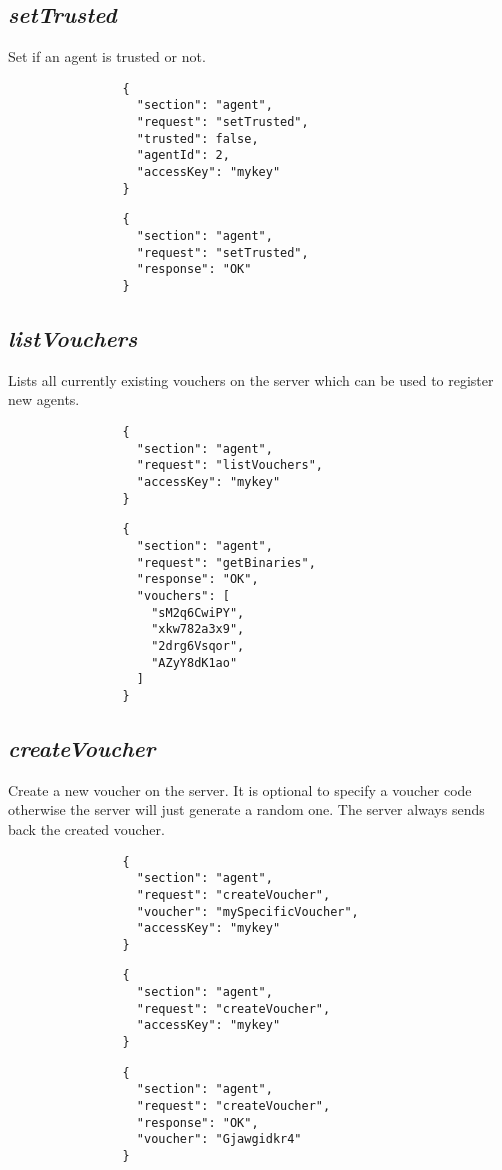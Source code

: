 		\subsection*{\textit{setTrusted}}
			Set if an agent is trusted or not.
			{
				\color{blue}
				\begin{verbatim}
				{
				  "section": "agent",
				  "request": "setTrusted",
				  "trusted": false,
				  "agentId": 2,
				  "accessKey": "mykey"
				}
				\end{verbatim}
			}
			{
				\color{OliveGreen}
				\begin{verbatim}
				{
				  "section": "agent",
				  "request": "setTrusted",
				  "response": "OK"
				}
				\end{verbatim}
			}
		
		\subsection*{\textit{listVouchers}}
			Lists all currently existing vouchers on the server which can be used to register new agents.
			{
				\color{blue}
				\begin{verbatim}
				{
				  "section": "agent",
				  "request": "listVouchers",
				  "accessKey": "mykey"
				}
				\end{verbatim}
			}
			{
				\color{OliveGreen}
				\begin{verbatim}
				{
				  "section": "agent",
				  "request": "getBinaries",
				  "response": "OK",
				  "vouchers": [
				    "sM2q6CwiPY",
				    "xkw782a3x9",
				    "2drg6Vsqor",
				    "AZyY8dK1ao"
				  ]
				}
				\end{verbatim}
			}
		\subsection*{\textit{createVoucher}}
			Create a new voucher on the server. It is optional to specify a voucher code otherwise the server will just generate a random one. The server always sends back the created voucher.
			{
				\color{blue}
				\begin{verbatim}
				{
				  "section": "agent",
				  "request": "createVoucher",
				  "voucher": "mySpecificVoucher",
				  "accessKey": "mykey"
				}
				\end{verbatim}
			}
			{
				\color{blue}
				\begin{verbatim}
				{
				  "section": "agent",
				  "request": "createVoucher",
				  "accessKey": "mykey"
				}
				\end{verbatim}
			}
			{
				\color{OliveGreen}
				\begin{verbatim}
				{
				  "section": "agent",
				  "request": "createVoucher",
				  "response": "OK",
				  "voucher": "Gjawgidkr4"
				}
				\end{verbatim}
			}
